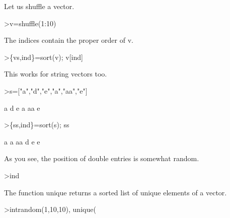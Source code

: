 \documentclass{article}
\begin{document}
\begin{eulernotebook}
\begin{eulercomment}
\begin{eulercomment}
\begin{eulercomment}
\begin{eulercomment}
\begin{eulercomment}
\begin{eulercomment}
\begin{eulercomment}
Let us shuffle a vector.
\end{eulercomment}
\begin{eulerprompt}
>v=shuffle(1:10)
\end{eulerprompt}
\begin{euleroutput}
  [4,  5,  10,  6,  8,  9,  1,  7,  2,  3]
\end{euleroutput}
\begin{eulercomment}
The indices contain the proper order of v.
\end{eulercomment}
\begin{eulerprompt}
>\{vs,ind\}=sort(v); v[ind]
\end{eulerprompt}
\begin{euleroutput}
  [1,  2,  3,  4,  5,  6,  7,  8,  9,  10]
\end{euleroutput}
\begin{eulercomment}
This works for string vectors too.
\end{eulercomment}
\begin{eulerprompt}
>s=["a","d","e","a","aa","e"]
\end{eulerprompt}
\begin{euleroutput}
  a
  d
  e
  a
  aa
  e
\end{euleroutput}
\begin{eulerprompt}
>\{ss,ind\}=sort(s); ss
\end{eulerprompt}
\begin{euleroutput}
  a
  a
  aa
  d
  e
  e
\end{euleroutput}
\begin{eulercomment}
As you see, the position of double entries is somewhat random.
\end{eulercomment}
\begin{eulerprompt}
>ind
\end{eulerprompt}
\begin{euleroutput}
  [4,  1,  5,  2,  6,  3]
\end{euleroutput}
\begin{eulercomment}
The function unique returns a sorted list of unique elements of a
vector.
\end{eulercomment}
\begin{eulerprompt}
>intrandom(1,10,10), unique(%
\end{eulerprompt}
\begin{euleroutput}
  [4,  4,  9,  2,  6,  5,  10,  6,  5,  1]
  [1,  2,  4,  5,  6,  9,  10]
\end{euleroutput}
\begin{eulercomment}

\end{eulercomment}
\end{eulercomment}
\end{eulercomment}
\end{eulercomment}
\end{eulercomment}
\end{eulercomment}
\end{eulercomment}
\end{eulernotebook}
\end{document}
